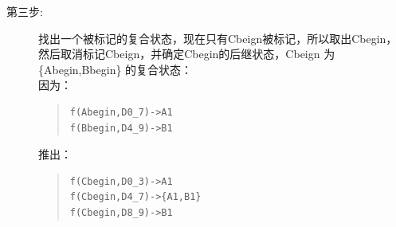 \documentclass[a4paper,11pt]{article}
\begin{document}
\begin{CJK}{UTF8}{gbsn}
\begin{description}
\item[第三步:]找出一个被标记的复合状态，现在只有Cbeign被标记，所以取出Cbegin，然后取消标记Cbeign，并确定Cbegin的后继状态，Cbeign 为 \{Abegin,Bbegin\} 的复合状态：\\
因为：
\begin{quote}
\begin{verbatim}
f(Abegin,D0_7)->A1
f(Bbegin,D4_9)->B1
\end{verbatim}
\end{quote}
推出：
\begin{quote}
\begin{verbatim}
f(Cbegin,D0_3)->A1
f(Cbegin,D4_7)->{A1,B1}
f(Cbegin,D8_9)->B1
\end{verbatim}
\end{quote}


\end{description}





\end{CJK}
\end{document}
